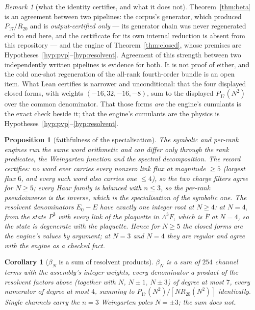 \documentclass[11pt]{article}
\newtheorem{proposition}[theorem]{Proposition}
\newtheorem{corollary}[theorem]{Corollary}
\theoremstyle{definition}
\theoremstyle{remark}
\newtheorem{remark}[theorem]{Remark}
\newcommand{\chk}[1]{}
\begin{document}
\begin{remark}[what the identity certifies, and what it does not]\label{rem:twopipelines}
Theorem~\ref{thm:beta} is an agreement between two pipelines: the corpus's
generator, which produced $P_{17}/R_{20}$ and is \emph{output-certified only}
--- its generator chain was never regenerated end to end here, and the
certificate for its own internal reduction is absent from this repository ---
and the engine of Theorem~\ref{thm:closed}, whose premises are
Hypotheses~\ref{hyp:pvp}--\ref{hyp:resolvent}. Agreement of this strength
between two independently written pipelines is evidence for both. It is not
proof of either, and the cold one-shot regeneration of the all-rank
fourth-order bundle is an open item. What Lean certifies is narrower and
unconditional: that the four displayed closed forms, with weights
$(-16,32,-16,-8)$, sum to the displayed $P_{17}(N^2)$ over the common
denominator. That those forms \emph{are} the engine's cumulants is the exact
check beside it; that the engine's cumulants are the physics is
Hypotheses~\ref{hyp:pvp}--\ref{hyp:resolvent}.
\end{remark}

\begin{proposition}[faithfulness of the specialisation]\label{prop:faithful}
The symbolic and per-rank engines run the same word arithmetic and can differ
only through the rank predicates, the Weingarten function and the spectral
decomposition. The record certifies: no word ever carries every nonzero link
flux at magnitude $\ge5$ (largest flux $6$, and every such word also carries one
$\le4$), so the two charge filters agree for $N\ge5$; every Haar family is
balanced with $n\le3$, so the per-rank pseudoinverse is the inverse, which is
the specialisation of the symbolic one. The resolvent denominators $E_0-E$ have
exactly one integer root at $N\ge4$: at $N=4$, from the state $P^3$ with every
link of the plaquette in $\Lambda^3F$, which is $\bar F$ at $N=4$, so the state
is degenerate with the plaquette. Hence for $N\ge5$ the closed forms are the
engine's values by argument; at $N=3$ and $N=4$ they are regular and agree with
the engine as a checked fact.\chk{every cumulant of the beta\_N assembly is one rational function of N computed over Q(N): the closed forms are derived, not reconstructed, and specialise to the per-rank records at N = 3..70}
\end{proposition}

\begin{corollary}[$\beta_N$ is a sum of resolvent products]\label{cor:resolvent}
$\beta_N$ is a sum of $254$ channel terms with the assembly's integer weights,
every denominator a product of the resolvent factors above (together with $N$,
$N\pm1$, $N\pm3$) of degree at most $7$, every numerator of degree at most $4$,
summing to $P_{17}(N^2)/[N R_{20}(N^2)]$ identically. Single channels carry the
$n=3$ Weingarten poles $N=\pm3$; the sum does not.\chk{beta\_N is a sum of resolvent products: -16 u + 32 d - 16 corner + 848/(N(N\^{}2-1)\^{}3) over 254 channel terms, each a rational function of N whose denominator is a product of resolvent factors, equals P17(N\^{}2)/(N R20(N\^{}2))}
\end{corollary}
\end{document}
